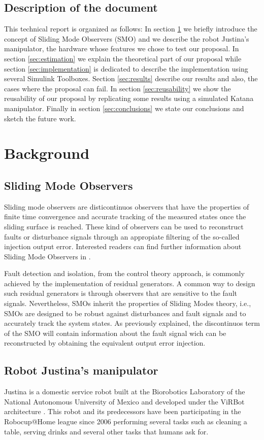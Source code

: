\documentclass[a4paper, 10pt]{article}
\begin{document}
\subsection{Description of the document}
This technical report is organized as follows: In section \ref{sec:background} we briefly introduce the concept of Sliding Mode Observers (SMO) and we describe the robot Justina's manipulator, the hardware whose features we chose to test our proposal. In section \ref{sec:estimation} we explain the theoretical part of our proposal while section \ref{sec:implementation} is dedicated to describe the implementation using several Simulink Toolboxes. Section \ref{sec:results} describe our results and also, the cases where the proposal can fail. In section \ref{sec:reusability} we show the reusability of our proposal by replicating some results using a simulated Katana manipulator. Finally in section \ref{sec:conclusions} we state our conclusions and sketch the future work. 
\section{Background}
\label{sec:background}
\subsection{Sliding Mode Observers}
Sliding mode observers are disticontinuos observers that have the properties of finite time convergence and accurate tracking of the measured states once the sliding surface is reached. These kind of observers can be used to reconstruct faults or disturbance signals through an appropiate filtering of the so-called injection output error. Interested readers can find further information about Sliding Mode Observers in \cite{shtessel2014sliding,davila2005second,fridman2002higher}.

Fault detection and isolation, from the control theory approach, is commonly achieved by the implementation of residual generators. A common way to design such residual generators is through observers that are sensitive to the fault signals. Nevertheless, SMOs inherit the properties of Sliding Modes theory, i.e., SMOs are designed to be robust against disturbances and fault signals and to accurately track the system states. As previously explained, the discontinuos term of the SMO will contain information about the fault signal wich can be reconstructed by obtaining the equivalent output error injection. 

\subsection{Robot Justina's manipulator}
Justina is a domestic service robot built at the Biorobotics Laboratory of the National Autonomous University of Mexico and developed under the ViRBot architecture \cite{savage2008virbot}. This robot and its predecessors have been participating in the Robocup@Home league \cite{wachsmuth2015robocup} since 2006 performing several tasks such as cleaning a table, serving drinks and several other tasks that humans ask for. 
\end{document}
